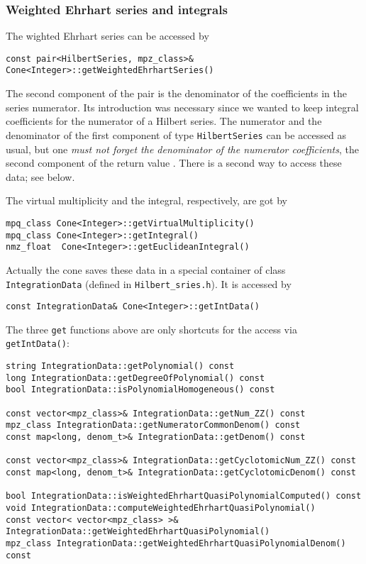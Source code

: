 \documentclass[12pt,a4paper]{scrartcl}
\theoremstyle{definition}
\begin{document}
\begin{small}
\subsubsection{Weighted Ehrhart series and integrals}

The wighted Ehrhart series can be accessed by
\begin{Verbatim}
const pair<HilbertSeries, mpz_class>& Cone<Integer>::getWeightedEhrhartSeries()
\end{Verbatim}
The second component of the pair is the denominator of the coefficients in the series numerator. Its introduction was necessary since we wanted to keep integral coefficients for the numerator of a Hilbert series. The numerator and the denominator of the first component of type \verb|HilbertSeries| can be accessed as usual, but one \emph{must not forget the denominator of the numerator coefficients}, the second component of the return value . There is a second way to access these data; see below.

The virtual multiplicity and the integral, respectively, are got by
\begin{Verbatim}
mpq_class Cone<Integer>::getVirtualMultiplicity()
mpq_class Cone<Integer>::getIntegral()
nmz_float  Cone<Integer>::getEuclideanIntegral()
\end{Verbatim}

Actually the cone saves these data in a special container of class \verb|IntegrationData| (defined in \verb|Hilbert_sries.h|). It is accessed by
\begin{Verbatim}
const IntegrationData& Cone<Integer>::getIntData()
\end{Verbatim}
The three \verb|get| functions above are only shortcuts for the access via \verb|getIntData()|:
\begin{Verbatim}
string IntegrationData::getPolynomial() const
long IntegrationData::getDegreeOfPolynomial() const
bool IntegrationData::isPolynomialHomogeneous() const

const vector<mpz_class>& IntegrationData::getNum_ZZ() const
mpz_class IntegrationData::getNumeratorCommonDenom() const
const map<long, denom_t>& IntegrationData::getDenom() const

const vector<mpz_class>& IntegrationData::getCyclotomicNum_ZZ() const
const map<long, denom_t>& IntegrationData::getCyclotomicDenom() const

bool IntegrationData::isWeightedEhrhartQuasiPolynomialComputed() const
void IntegrationData::computeWeightedEhrhartQuasiPolynomial()
const vector< vector<mpz_class> >& IntegrationData::getWeightedEhrhartQuasiPolynomial()
mpz_class IntegrationData::getWeightedEhrhartQuasiPolynomialDenom() const


\end{Verbatim}
\end{small}
\end{document}
